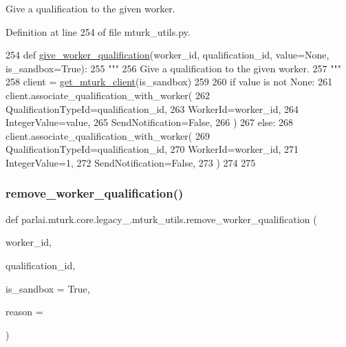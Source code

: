 \begin{DoxyVerb}Give a qualification to the given worker.
\end{DoxyVerb}
 

Definition at line 254 of file mturk\+\_\+utils.\+py.


\begin{DoxyCode}
254 \textcolor{keyword}{def }\hyperlink{namespaceparlai_1_1mturk_1_1core_1_1mturk__utils_a640e2d9d121507f92649cccbd27e3af9}{give\_worker\_qualification}(worker\_id, qualification\_id, value=None, 
      is\_sandbox=True):
255     \textcolor{stringliteral}{"""}
256 \textcolor{stringliteral}{    Give a qualification to the given worker.}
257 \textcolor{stringliteral}{    """}
258     client = \hyperlink{namespaceparlai_1_1mturk_1_1core_1_1mturk__utils_a577e2527c04682284394b0951a090695}{get\_mturk\_client}(is\_sandbox)
259 
260     \textcolor{keywordflow}{if} value \textcolor{keywordflow}{is} \textcolor{keywordflow}{not} \textcolor{keywordtype}{None}:
261         client.associate\_qualification\_with\_worker(
262             QualificationTypeId=qualification\_id,
263             WorkerId=worker\_id,
264             IntegerValue=value,
265             SendNotification=\textcolor{keyword}{False},
266         )
267     \textcolor{keywordflow}{else}:
268         client.associate\_qualification\_with\_worker(
269             QualificationTypeId=qualification\_id,
270             WorkerId=worker\_id,
271             IntegerValue=1,
272             SendNotification=\textcolor{keyword}{False},
273         )
274 
275 
\end{DoxyCode}
\mbox{\label{namespaceparlai_1_1mturk_1_1core_1_1legacy__2018_1_1mturk__utils_aeb2a9fb74d8d0bbfe744bb6d89bee910}} 
\subsubsection{\texorpdfstring{remove\+\_\+worker\+\_\+qualification()}{remove\_worker\_qualification()}}
{\footnotesize\ttfamily def parlai.\+mturk.\+core.\+legacy\+\_.\+mturk\+\_\+utils.\+remove\+\_\+worker\+\_\+qualification (\begin{DoxyParamCaption}\item[{}]{worker\+\_\+id,  }\item[{}]{qualification\+\_\+id,  }\item[{}]{is\+\_\+sandbox = {\ttfamily True},  }\item[{}]{reason = {\ttfamily \textquotesingle{}\textquotesingle{}} }\end{DoxyParamCaption})}

